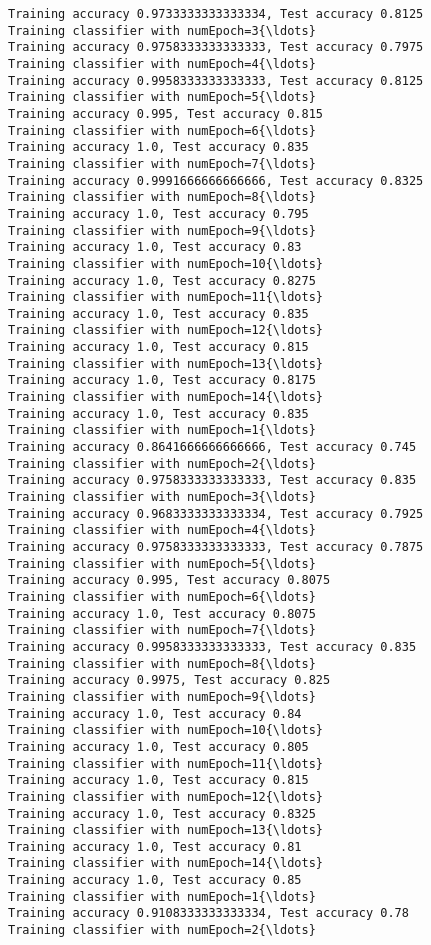 \documentclass[11pt]{article}
\begin{document}
\begin{Verbatim}[commandchars=\\\{\}]
Training accuracy 0.9733333333333334, Test accuracy 0.8125
Training classifier with numEpoch=3{\ldots}
Training accuracy 0.9758333333333333, Test accuracy 0.7975
Training classifier with numEpoch=4{\ldots}
Training accuracy 0.9958333333333333, Test accuracy 0.8125
Training classifier with numEpoch=5{\ldots}
Training accuracy 0.995, Test accuracy 0.815
Training classifier with numEpoch=6{\ldots}
Training accuracy 1.0, Test accuracy 0.835
Training classifier with numEpoch=7{\ldots}
Training accuracy 0.9991666666666666, Test accuracy 0.8325
Training classifier with numEpoch=8{\ldots}
Training accuracy 1.0, Test accuracy 0.795
Training classifier with numEpoch=9{\ldots}
Training accuracy 1.0, Test accuracy 0.83
Training classifier with numEpoch=10{\ldots}
Training accuracy 1.0, Test accuracy 0.8275
Training classifier with numEpoch=11{\ldots}
Training accuracy 1.0, Test accuracy 0.835
Training classifier with numEpoch=12{\ldots}
Training accuracy 1.0, Test accuracy 0.815
Training classifier with numEpoch=13{\ldots}
Training accuracy 1.0, Test accuracy 0.8175
Training classifier with numEpoch=14{\ldots}
Training accuracy 1.0, Test accuracy 0.835
Training classifier with numEpoch=1{\ldots}
Training accuracy 0.8641666666666666, Test accuracy 0.745
Training classifier with numEpoch=2{\ldots}
Training accuracy 0.9758333333333333, Test accuracy 0.835
Training classifier with numEpoch=3{\ldots}
Training accuracy 0.9683333333333334, Test accuracy 0.7925
Training classifier with numEpoch=4{\ldots}
Training accuracy 0.9758333333333333, Test accuracy 0.7875
Training classifier with numEpoch=5{\ldots}
Training accuracy 0.995, Test accuracy 0.8075
Training classifier with numEpoch=6{\ldots}
Training accuracy 1.0, Test accuracy 0.8075
Training classifier with numEpoch=7{\ldots}
Training accuracy 0.9958333333333333, Test accuracy 0.835
Training classifier with numEpoch=8{\ldots}
Training accuracy 0.9975, Test accuracy 0.825
Training classifier with numEpoch=9{\ldots}
Training accuracy 1.0, Test accuracy 0.84
Training classifier with numEpoch=10{\ldots}
Training accuracy 1.0, Test accuracy 0.805
Training classifier with numEpoch=11{\ldots}
Training accuracy 1.0, Test accuracy 0.815
Training classifier with numEpoch=12{\ldots}
Training accuracy 1.0, Test accuracy 0.8325
Training classifier with numEpoch=13{\ldots}
Training accuracy 1.0, Test accuracy 0.81
Training classifier with numEpoch=14{\ldots}
Training accuracy 1.0, Test accuracy 0.85
Training classifier with numEpoch=1{\ldots}
Training accuracy 0.9108333333333334, Test accuracy 0.78
Training classifier with numEpoch=2{\ldots}

\end{Verbatim}
\end{document}
